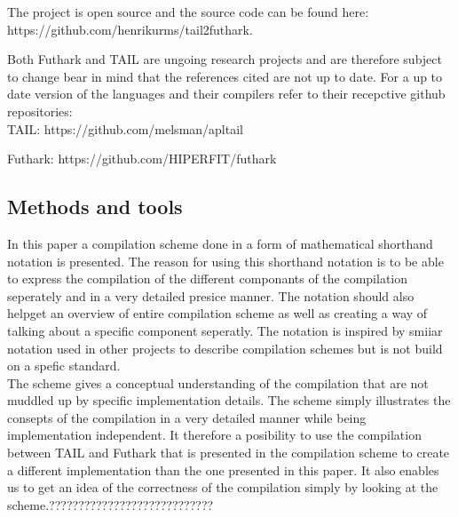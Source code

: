 \documentclass[11pt]{article}
\begin{document}
The project is open source and the source code can be found here:\\ https://github.com/henrikurms/tail2futhark.

Both Futhark and TAIL are ungoing research projects and are therefore subject to change bear in mind that the references cited are not up to date. For a up to date version of the languages and their compilers refer to their recepctive github repositories: \\

TAIL: https://github.com/melsman/apltail

Futhark: https://github.com/HIPERFIT/futhark


\subsection{Methods and tools}
In this paper a compilation scheme done in a form of mathematical shorthand notation is presented. 
The reason for using this shorthand notation is to be able to express the compilation of the different componants of the compilation seperately and in a very detailed presice manner. 
The notation should also helpget an overview of entire compilation scheme as well as creating a way of talking about a specific component seperatly. The notation is inspired by smiiar notation used in other projects \cite{TorbenMogensen}\cite{MartinElsmanNotation} to describe compilation schemes but is not build on a spefic standard. \\

The scheme gives a conceptual understanding of the compilation that are not muddled up by specific implementation details. The scheme simply illustrates the consepts of the compilation in a very detailed manner while being implementation independent. It therefore a posibility to use the compilation between TAIL and Futhark that is presented in the compilation scheme to create a different implementation than the one presented in this paper.
It also enables us to get an idea of the correctness of the compilation simply by looking at the scheme.????????????????????????????\\
\end{document}
